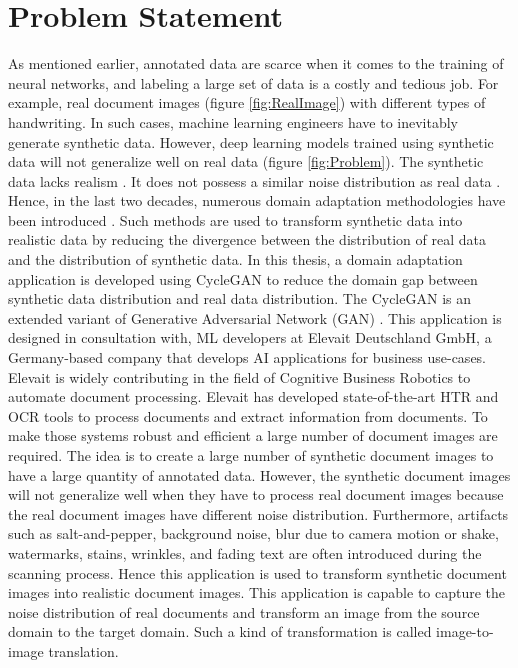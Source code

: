 \section{Problem Statement}\label{ProblemStatement}

As mentioned earlier, annotated data are scarce when it comes to the training of neural networks, and labeling a large set of data is a costly and tedious job. For example, real document images (figure \ref{fig:RealImage}) with different types of handwriting. In such cases, machine learning engineers have to inevitably generate synthetic data. However, deep learning models trained using synthetic data will not generalize well on real data \cite{8978087} (figure \ref{fig:Problem}). The synthetic data lacks realism \cite{8978087}. It does not possess a similar noise distribution as real data \cite{8978087}. Hence, in the last two decades, numerous domain adaptation methodologies have been introduced \cite{8978011}. Such methods are used to transform synthetic data into realistic data by reducing the divergence between the distribution of real data and the distribution of synthetic data. In this thesis, a domain adaptation application is developed using \ac{CycleGAN} \cite{zhu2020unpaired} to reduce the domain gap between synthetic data distribution and real data distribution. The \ac{CycleGAN} is an extended variant of Generative Adversarial Network (\ac{GAN}) \cite{goodfellow2014generative}. This application is designed in consultation with, \ac{ML} developers at Elevait Deutschland GmbH, a Germany-based company that develops \ac{AI} applications for business use-cases. Elevait is widely contributing in the field of Cognitive Business Robotics \cite{Metta2012} to automate document processing. Elevait has developed state-of-the-art \ac{HTR} and \ac{OCR} tools to process documents and extract information from documents. To make those systems robust and efficient a large number of document images are required. The idea is to create a large number of synthetic document images to have a large quantity of annotated data. However, the synthetic document images will not generalize well when they have to process real document images because the real document images have different noise distribution. Furthermore, artifacts such as salt-and-pepper, background noise, blur due to camera motion or shake, watermarks, stains, wrinkles, and fading text are often introduced during the scanning process. Hence this application is used to transform synthetic document images into realistic document images. This application is capable to capture the noise distribution of real documents and transform an image from the source domain to the target domain. Such a kind of transformation is called image-to-image translation.


